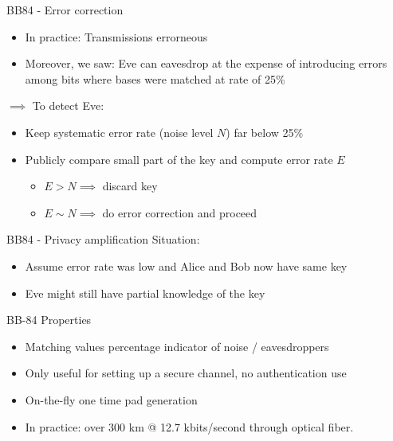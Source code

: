 \documentclass{beamer}
\begin{document}
	\begin{frame}{BB84 - Error correction}
		\begin{itemize}
			\item In practice: Transmissions errorneous
			\item Moreover, we saw: Eve can eavesdrop at the expense of
			introducing errors among bits where bases were matched at
			rate of 25\%
		\end{itemize}
		$\implies$ To detect Eve:
		\begin{itemize}
			\item Keep systematic error rate (noise level $N$) far below
			25\%
			\item Publicly compare small part of the key and compute
			error rate $E$
			\begin{itemize}
				\item $E > N \implies$ discard key
				\item $E \sim N \implies$ do error correction and proceed
			\end{itemize}
		\end{itemize}
	\end{frame}

	\begin{frame}{BB84 - Privacy amplification}
		Situation:
		\begin{itemize}
			\item Assume error rate was low and Alice and Bob now have
			same key
			\item Eve might still have partial knowledge of the key
		\end{itemize}

	\end{frame}


	\begin{frame}{BB-84 Properties} %
		\begin{itemize}
			\item Matching values percentage indicator of noise / eavesdroppers
			\item Only useful for setting up a secure channel, no authentication use
			\item On-the-fly one time pad generation
			\item In practice: over 300 km @ 12.7 kbits/second through optical fiber.
		\end{itemize}
	\end{frame}
\end{document}
